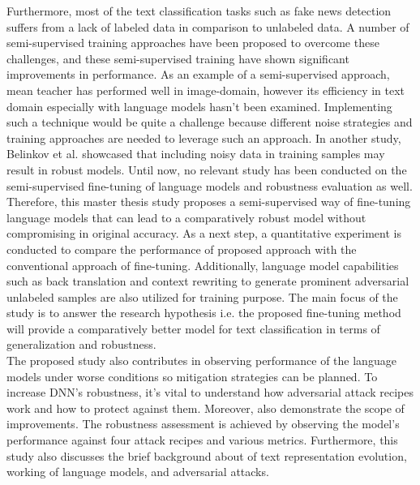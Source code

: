 \documentclass[%
	BCOR=8mm, %
	DIV=12,
	toc=bibliography, %
	toc=listof, %
	oneside, %
	egregdoesnotlikesansseriftitles, %
	]{scrbook}
\begin{document}
Furthermore, most of the text classification tasks such as fake news detection suffers from a lack of labeled data in comparison to unlabeled data. A number of semi-supervised training approaches have been proposed to overcome these challenges, and these semi-supervised training have shown significant improvements in performance. As an example of a semi-supervised approach, mean teacher \cite{tarvainen_mean_2018}  has performed well in image-domain, however its efficiency in text domain especially with language models hasn't been examined. Implementing such a technique would be quite a challenge because different noise strategies and training approaches are needed to leverage such an approach. In another study, Belinkov et al. \cite{belinkov_synthetic_2018} showcased that including noisy data in training samples may result in robust models. Until now, no relevant study has been conducted on the  semi-supervised fine-tuning of language models and robustness evaluation as well. \\
Therefore, this master thesis study proposes a semi-supervised way of fine-tuning language models that can lead to a comparatively robust model without compromising in original accuracy. As a next step, a quantitative experiment is conducted to compare the performance of proposed approach with the conventional approach of fine-tuning. Additionally, language model capabilities such as back translation and context rewriting to generate prominent adversarial unlabeled samples are also utilized for training purpose. The main focus of the study is to answer the research hypothesis i.e. the proposed fine-tuning method will provide a comparatively better model for text classification in terms of generalization and robustness.\\
The proposed study also contributes in observing performance of the language models under worse conditions so mitigation strategies can be planned. To increase DNN's robustness, it's vital to understand how adversarial attack recipes work and how to protect against them. Moreover, also demonstrate the scope of improvements. The robustness assessment is achieved by observing the model's performance against four attack recipes and various metrics. Furthermore, this study also discusses the brief background about of text representation evolution, working of language models, and adversarial attacks. 
\end{document}
